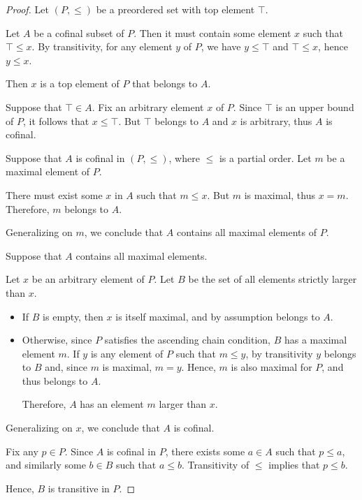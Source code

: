 \begin{proof}
   Let \( (P, \leq) \) be a preordered set with top element \( \top \).

  \SufficiencySubProof* Let \( A \) be a cofinal subset of \( P \). Then it must contain some element \( x \) such that \( \top \leq x \). By transitivity, for any element \( y \) of \( P \), we have \( y \leq \top \) and \( \top \leq x \), hence \( y \leq x \).

  Then \( x \) is a top element of \( P \) that belongs to \( A \).

  \NecessitySubProof* Suppose that \( \top \in A \). Fix an arbitrary element \( x \) of \( P \). Since \( \top \) is an upper bound of \( P \), it follows that \( x \leq \top \). But \( \top \) belongs to \( A \) and \( x \) is arbitrary, thus \( A \) is cofinal.

   Suppose that \( A \) is cofinal in \( (P, \leq) \), where \( \leq \) is a partial order. Let \( m \) be a maximal element of \( P \).

  There must exist some \( x \) in \( A \) such that \( m \leq x \). But \( m \) is maximal, thus \( x = m \). Therefore, \( m \) belongs to \( A \).

  Generalizing on \( m \), we conclude that \( A \) contains all maximal elements of \( P \).

   Suppose that \( A \) contains all maximal elements.

  Let \( x \) be an arbitrary element of \( P \). Let \( B \) be the set of all elements strictly larger than \( x \).
  \begin{itemize}
    \item If \( B \) is empty, then \( x \) is itself maximal, and by assumption belongs to \( A \).
    \item Otherwise, since \( P \) satisfies the ascending chain condition, \( B \) has a maximal element \( m \). If \( y \) is any element of \( P \) such that \( m \leq y \), by transitivity \( y \) belongs to \( B \) and, since \( m \) is maximal, \( m = y \). Hence, \( m \) is also maximal for \( P \), and thus belongs to \( A \).

    Therefore, \( A \) has an element \( m \) larger than \( x \).
  \end{itemize}

  Generalizing on \( x \), we conclude that \( A \) is cofinal.

   Fix any \( p \in P \). Since \( A \) is cofinal in \( P \), there exists some \( a \in A \) such that \( p \leq a \), and similarly some \( b \in B \) such that \( a \leq b \). Transitivity of \( \leq \) implies that \( p \leq b \).

  Hence, \( B \) is transitive in \( P \).
\end{proof}

